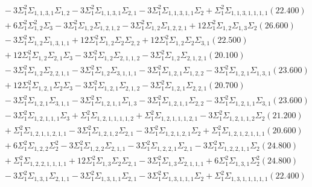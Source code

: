 \documentclass[12pt]{article}
\begin{document}
\begin{landscape}
\begin{align*}
		&\quad\quad -3\Sigma_{1}^{2}\Sigma_{1,1,3,1}\Sigma_{1,2}-3\Sigma_{1}^{2}\Sigma_{1,1,3,1}\Sigma_{2,1}-3\Sigma_{1}^{2}\Sigma_{1,1,3,1,1}\Sigma_{2}+\Sigma_{1}^{2}\Sigma_{1,1,3,1,1,1,1}(22.400) \\ 
		&\quad\quad +6\Sigma_{1}^{2}\Sigma_{1,2}^{2}\Sigma_{3}-3\Sigma_{1}^{2}\Sigma_{1,2}\Sigma_{1,2,1,2}-3\Sigma_{1}^{2}\Sigma_{1,2}\Sigma_{1,2,2,1}+12\Sigma_{1}^{2}\Sigma_{1,2}\Sigma_{1,3}\Sigma_{2}(26.600) \\ 
		&\quad\quad -3\Sigma_{1}^{2}\Sigma_{1,2}\Sigma_{1,3,1,1}+12\Sigma_{1}^{2}\Sigma_{1,2}\Sigma_{2}\Sigma_{2,2}+12\Sigma_{1}^{2}\Sigma_{1,2}\Sigma_{2}\Sigma_{3,1}(22.500) \\ 
		&\quad\quad +12\Sigma_{1}^{2}\Sigma_{1,2}\Sigma_{2,1}\Sigma_{3}-3\Sigma_{1}^{2}\Sigma_{1,2}\Sigma_{2,1,1,2}-3\Sigma_{1}^{2}\Sigma_{1,2}\Sigma_{2,1,2,1}(20.100) \\ 
		&\quad\quad -3\Sigma_{1}^{2}\Sigma_{1,2}\Sigma_{2,2,1,1}-3\Sigma_{1}^{2}\Sigma_{1,2}\Sigma_{3,1,1,1}-3\Sigma_{1}^{2}\Sigma_{1,2,1}\Sigma_{1,2,2}-3\Sigma_{1}^{2}\Sigma_{1,2,1}\Sigma_{1,3,1}(23.600) \\ 
		&\quad\quad +12\Sigma_{1}^{2}\Sigma_{1,2,1}\Sigma_{2}\Sigma_{3}-3\Sigma_{1}^{2}\Sigma_{1,2,1}\Sigma_{2,1,2}-3\Sigma_{1}^{2}\Sigma_{1,2,1}\Sigma_{2,2,1}(20.700) \\ 
		&\quad\quad -3\Sigma_{1}^{2}\Sigma_{1,2,1}\Sigma_{3,1,1}-3\Sigma_{1}^{2}\Sigma_{1,2,1,1}\Sigma_{1,3}-3\Sigma_{1}^{2}\Sigma_{1,2,1,1}\Sigma_{2,2}-3\Sigma_{1}^{2}\Sigma_{1,2,1,1}\Sigma_{3,1}(23.600) \\ 
		&\quad\quad -3\Sigma_{1}^{2}\Sigma_{1,2,1,1,1}\Sigma_{3}+\Sigma_{1}^{2}\Sigma_{1,2,1,1,1,1,2}+\Sigma_{1}^{2}\Sigma_{1,2,1,1,1,2,1}-3\Sigma_{1}^{2}\Sigma_{1,2,1,1,2}\Sigma_{2}(21.200) \\ 
		&\quad\quad +\Sigma_{1}^{2}\Sigma_{1,2,1,1,2,1,1}-3\Sigma_{1}^{2}\Sigma_{1,2,1,2}\Sigma_{2,1}-3\Sigma_{1}^{2}\Sigma_{1,2,1,2,1}\Sigma_{2}+\Sigma_{1}^{2}\Sigma_{1,2,1,2,1,1,1}(20.600) \\ 
		&\quad\quad +6\Sigma_{1}^{2}\Sigma_{1,2,2}\Sigma_{2}^{2}-3\Sigma_{1}^{2}\Sigma_{1,2,2}\Sigma_{2,1,1}-3\Sigma_{1}^{2}\Sigma_{1,2,2,1}\Sigma_{2,1}-3\Sigma_{1}^{2}\Sigma_{1,2,2,1,1}\Sigma_{2}(24.800) \\ 
		&\quad\quad +\Sigma_{1}^{2}\Sigma_{1,2,2,1,1,1,1}+12\Sigma_{1}^{2}\Sigma_{1,3}\Sigma_{2}\Sigma_{2,1}-3\Sigma_{1}^{2}\Sigma_{1,3}\Sigma_{2,1,1,1}+6\Sigma_{1}^{2}\Sigma_{1,3,1}\Sigma_{2}^{2}(24.800) \\ 
		&\quad\quad -3\Sigma_{1}^{2}\Sigma_{1,3,1}\Sigma_{2,1,1}-3\Sigma_{1}^{2}\Sigma_{1,3,1,1}\Sigma_{2,1}-3\Sigma_{1}^{2}\Sigma_{1,3,1,1,1}\Sigma_{2}+\Sigma_{1}^{2}\Sigma_{1,3,1,1,1,1,1}(22.400) \\ 

\end{align*}
\end{landscape}
\end{document}
